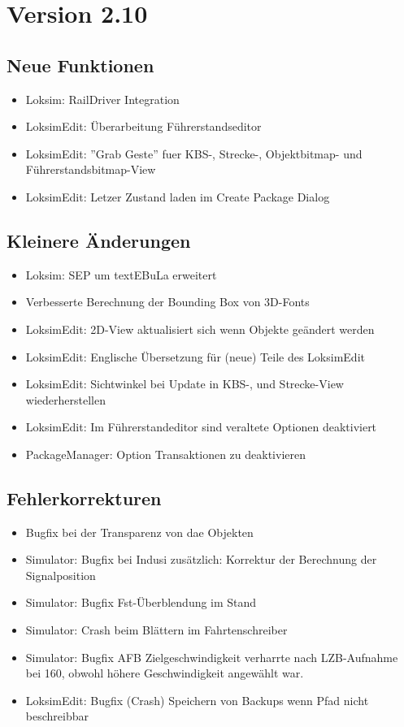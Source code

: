 \section{Version 2.10}
\subsection{Neue Funktionen}
\begin{itemize}
    \item Loksim: RailDriver Integration
    \item LoksimEdit: Überarbeitung Führerstandseditor
    \item LoksimEdit: ''Grab Geste'' fuer KBS-, Strecke-, Objektbitmap- und Führerstandsbitmap-View
    \item LoksimEdit: Letzer Zustand laden im Create Package Dialog
\end{itemize}


\subsection{Kleinere Änderungen}
\begin{itemize}
    \item Loksim: SEP um textEBuLa erweitert
    \item Verbesserte Berechnung der Bounding Box von 3D-Fonts
    \item LoksimEdit: 2D-View aktualisiert sich wenn Objekte geändert werden
    \item LoksimEdit: Englische Übersetzung für (neue) Teile des LoksimEdit
    \item LoksimEdit: Sichtwinkel bei Update in KBS-, und Strecke-View wiederherstellen
    \item LoksimEdit: Im Führerstandeditor sind veraltete Optionen deaktiviert
    \item PackageManager: Option Transaktionen zu deaktivieren
\end{itemize}

\subsection{Fehlerkorrekturen}
\begin{itemize}
	\item Bugfix bei der Transparenz von dae Objekten
    \item Simulator: Bugfix bei Indusi zusätzlich: Korrektur der Berechnung der Signalposition
    \item Simulator: Bugfix Fst-Überblendung im Stand
    \item Simulator: Crash beim Blättern im Fahrtenschreiber
	\item Simulator: Bugfix AFB Zielgeschwindigkeit verharrte nach LZB-Aufnahme bei 160, obwohl höhere Geschwindigkeit angewählt war.
    \item LoksimEdit: Bugfix (Crash) Speichern von Backups wenn Pfad nicht beschreibbar
\end{itemize}
